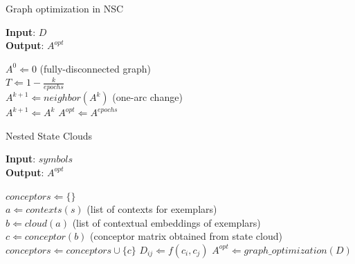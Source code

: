 \begin{algorithm}[!tbp]
    \caption{Graph optimization in NSC}
    \label{alg:gs}
    \hspace*{\algorithmicindent} \textbf{Input}: $D$ \\
    \hspace*{\algorithmicindent} \textbf{Output}: $A^{opt}$
    \begin{algorithmic}
        \STATE $A^0 \Leftarrow 0 $ (fully-disconnected graph) \\
        \STATE $T \Leftarrow 1 - \frac{k}{epochs}$ \\
        \STATE $A^{k+1} \Leftarrow neighbor(A^k)$ (one-arc change) \\
        \STATE $ A^{k+1} \Leftarrow A^{k}$
        \ENDIF
        \ENDFOR
        \STATE $A^{opt} \Leftarrow A^{epochs}$
    \end{algorithmic}
\end{algorithm}

\begin{algorithm}[!tbp]
    \caption{Nested State Clouds}
    \label{alg:nsc}
    \hspace*{\algorithmicindent} \textbf{Input}: $symbols$ \\
    \hspace*{\algorithmicindent} \textbf{Output}: $A^{opt}$
    \begin{algorithmic}
        \STATE $conceptors \Leftarrow \{\}$ \\
        \STATE $a \Leftarrow contexts(s)$ (list of contexts for exemplars) \\
        \STATE $b \Leftarrow cloud(a)$ (list of contextual embeddings of exemplars) \\
        \STATE $c \Leftarrow conceptor(b)$ (conceptor matrix obtained from state cloud)\\
        \STATE $conceptors \Leftarrow conceptors \cup \{c\}$
        \ENDFOR
        \STATE $D_{ij} \Leftarrow f(c_i, c_j)$
        \ENDFOR
        \ENDFOR
        \STATE $A^{opt} \Leftarrow graph\_optimization(D)$
    \end{algorithmic}
\end{algorithm}

